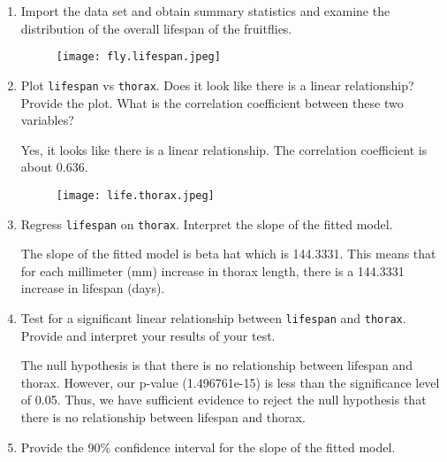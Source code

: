 \documentclass[12pt,letterpaper]{article}
\begin{document}
\begin{enumerate}
	
	\item
	Import the data set and obtain summary statistics and examine the distribution of the overall lifespan of the fruitflies.  
 
	\begin{figure} [H]
		\texttt{[image: fly.lifespan.jpeg]}
	\end{figure}
\newpage
	\item
	Plot \texttt{lifespan} vs \texttt{thorax}. Does it look like there is a linear relationship? Provide the plot. What is the correlation coefficient between these two variables?
		\vspace{1cm}
	
\noindent Yes, it looks like there is a linear relationship. The correlation coefficient is about 0.636.
\begin{figure} [H]
\texttt{[image: life.thorax.jpeg]}
\end{figure}
		
	\item
	Regress \texttt{lifespan} on \texttt{thorax}.  Interpret the slope of the fitted model.
			\vspace{1cm}

\noindent The slope of the fitted model is beta hat which is 144.3331. This means that for each millimeter (mm) increase in thorax length, there is a 144.3331 increase in lifespan (days).
\vspace{3cm}

	\item
	Test for a significant linear relationship between  \texttt{lifespan} and \texttt{thorax}. Provide and interpret your results of your test.

\noindent The null hypothesis is that there is no relationship between lifespan and thorax. However, our p-value (1.496761e-15) is less than the significance level of 0.05. Thus, we have sufficient evidence to reject the null hypothesis that there is no relationship between lifespan and thorax.
\vspace{1cm}

	\item
	
	Provide the 90\% confidence interval for the slope of the fitted model.
	

\end{enumerate}
\end{document}
